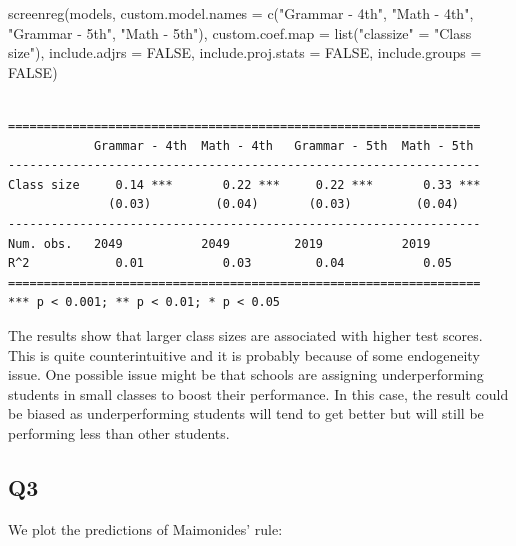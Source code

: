 \documentclass[
  letterpaper,
  DIV=11,
  numbers=noendperiod]{scrartcl}
\newenvironment{Shaded}{\begin{snugshade}}{\end{snugshade}}
\newcommand{\AttributeTok}[1]{\textcolor[rgb]{0.40,0.45,0.13}{#1}}
\newcommand{\ConstantTok}[1]{\textcolor[rgb]{0.56,0.35,0.01}{#1}}
\newcommand{\FunctionTok}[1]{\textcolor[rgb]{0.28,0.35,0.67}{#1}}
\newcommand{\NormalTok}[1]{\textcolor[rgb]{0.00,0.23,0.31}{#1}}
\newcommand{\OtherTok}[1]{\textcolor[rgb]{0.00,0.23,0.31}{#1}}
\newcommand{\StringTok}[1]{\textcolor[rgb]{0.13,0.47,0.30}{#1}}
\begin{document}
\begin{Shaded}
\begin{Highlighting}[]
\FunctionTok{screenreg}\NormalTok{(models, }
  \AttributeTok{custom.model.names =} \FunctionTok{c}\NormalTok{(}\StringTok{"Grammar {-} 4th"}\NormalTok{, }\StringTok{"Math {-} 4th"}\NormalTok{, }\StringTok{"Grammar {-} 5th"}\NormalTok{, }\StringTok{"Math {-} 5th"}\NormalTok{),}
  \AttributeTok{custom.coef.map =} \FunctionTok{list}\NormalTok{(}\StringTok{"classize"} \OtherTok{=} \StringTok{"Class size"}\NormalTok{),}
  \AttributeTok{include.adjrs =} \ConstantTok{FALSE}\NormalTok{, }\AttributeTok{include.proj.stats =} \ConstantTok{FALSE}\NormalTok{, }\AttributeTok{include.groups =} \ConstantTok{FALSE}\NormalTok{)}
\end{Highlighting}
\end{Shaded}

\begin{verbatim}

==================================================================
            Grammar - 4th  Math - 4th   Grammar - 5th  Math - 5th 
------------------------------------------------------------------
Class size     0.14 ***       0.22 ***     0.22 ***       0.33 ***
              (0.03)         (0.04)       (0.03)         (0.04)   
------------------------------------------------------------------
Num. obs.   2049           2049         2019           2019       
R^2            0.01           0.03         0.04           0.05    
==================================================================
*** p < 0.001; ** p < 0.01; * p < 0.05
\end{verbatim}

The results show that larger class sizes are associated with higher test
scores. This is quite counterintuitive and it is probably because of
some endogeneity issue. One possible issue might be that schools are
assigning underperforming students in small classes to boost their
performance. In this case, the result could be biased as underperforming
students will tend to get better but will still be performing less than
other students.

\subsection{Q3}\label{q3}

We plot the predictions of Maimonides' rule:
\end{document}
